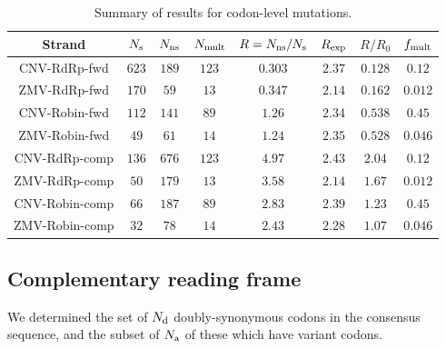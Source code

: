 \documentclass[unnumsec,webpdf,contemporary,large,namedate]{oup-authoring-template}%
\theoremstyle{thmstyleone}%
\theoremstyle{thmstyletwo}%
\theoremstyle{thmstylethree}%
\begin{document}
\begin{table}
\centering
\begin{tabular}{|c|c|c|c|c|c|c|c|}
\hline
Strand&$N_{\rm s}$&$N_{\rm ns}$&$N_{\rm mult}$&$R=N_{\rm ns}/N_{\rm s}$&$R_{\rm exp}$
&$R/R_0$&$f_{\rm mult}$\\
\hline
CNV-RdRp-fwd   &$623$ &$189$ & $123$ &$0.303$ &$2.37$&$0.128$&$0.12$\\
ZMV-RdRp-fwd   &$170$ &$59$ & $13$ &$0.347$ &$2.14$&$0.162$&$0.012$\\
CNV-Robin-fwd   &$112$&$141$& $89$   &$1.26$ & $2.34$&$0.538$&$0.45$\\
ZMV-Robin-fwd   &$49$&$61$& $14$   &$1.24$ & $2.35$&$0.528$&$0.046$\\
CNV-RdRp-comp &$136$&$676$& $123$ &$4.97$ &$2.43$&$2.04$&$0.12$\\
ZMV-RdRp-comp &$50$&$179$& $13$ &$3.58$ &$2.14$&$1.67$&$0.012$\\
CNV-Robin-comp &$66$&$187$&$89$&$2.83$&$2.39$&$1.23$&$0.45$\\
ZMV-Robin-comp &$32$&$78$&$14$&$2.43$&$2.28$&$1.07$&$0.046$\\
\hline
\end{tabular}
\caption{
\centering
Summary of results for codon-level mutations.
\label{tab: 5.2}}
\end{table}

\subsection{Complementary reading frame}
\label{sec: 5.2}

We determined the set of $N_{\rm d}$ doubly-synonymous codons in the consensus sequence, and
the subset of $N_{\rm a}$ of these which have variant codons.
\end{document}
